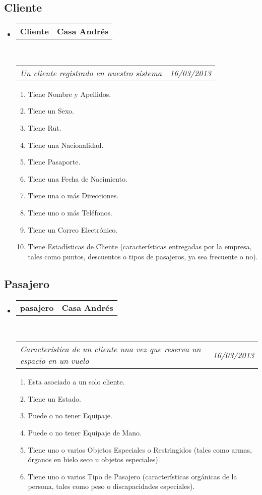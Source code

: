 \documentclass[10pt,letterpaper]{article}
\makeatletter
\newcommand{\headerrow}[2]
{\begin{tabular*}{\linewidth}{l@{\extracolsep{\fill}}r}
	#1 &
	#2 \\
\end{tabular*}}
\makeatother
\begin{document}
\subsection*{Cliente}

\begin{itemize}
	\parskip=0.1em

	\item
	\headerrow
		{\textbf{Cliente}}
		{\textbf{Casa Andrés}}
	\\
	\headerrow
		{\emph{Un cliente registrado en nuestro sistema}}
		{\emph{16/03/2013}}
	\begin{enumerate}
		\item Tiene Nombre y Apellidos.
		\item Tiene un Sexo.		
		\item Tiene Rut.
		\item Tiene una Nacionalidad.
		\item Tiene Pasaporte.
		\item Tiene una Fecha de Nacimiento.
		\item Tiene una o más Direcciones.
		\item Tiene uno o más Teléfonos.
		\item Tiene un Correo Electrónico.
		\item Tiene Estadísticas de Cliente (características entregadas por la empresa, tales como puntos, descuentos o tipos de pasajeros, ya sea frecuente o no).
	\end{enumerate}

\end{itemize}

\subsection*{Pasajero}

\begin{itemize}
	\parskip=0.1em

	\item
	\headerrow
		{\textbf{pasajero}}
		{\textbf{Casa Andrés}}
	\\
	\headerrow
		{\emph{Característica de un cliente una vez que reserva un espacio en un vuelo}}
		{\emph{16/03/2013}}
	\begin{enumerate}
		\item Esta asociado a un solo cliente.
		\item Tiene un Estado.
		\item Puede o no tener Equipaje.
		\item Puede o no tener Equipaje de Mano.
		\item Tiene uno o varios Objetos Especiales o Restringidos (tales como armas, órganos en hielo seco u objetos especiales).
		\item Tiene uno o varios Tipo de Pasajero (características orgánicas de la persona, tales como peso o discapacidades especiales).
		
	\end{enumerate}

\end{itemize}
\end{document}
